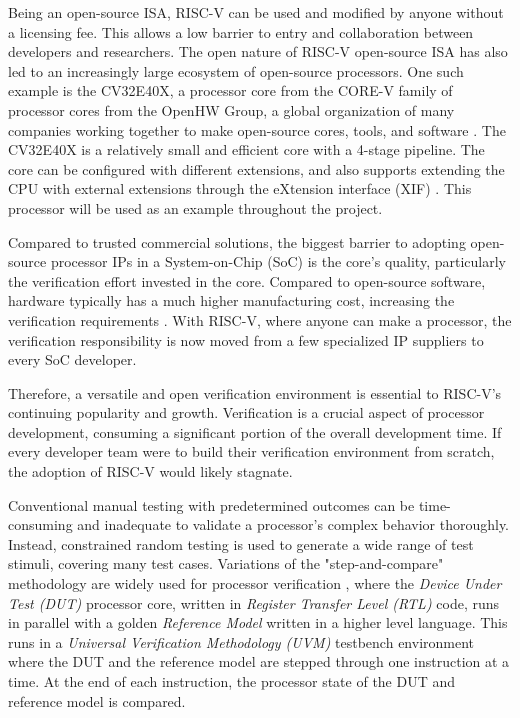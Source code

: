 Being an open-source ISA, RISC-V can be used and modified by anyone without a licensing fee. This allows a low barrier to entry and collaboration between developers and researchers. The open nature of RISC-V open-source ISA has also led to an increasingly large ecosystem of open-source processors. One such example is the CV32E40X, a processor core from the CORE-V family of processor cores from the OpenHW Group, a global organization of many companies working together to make open-source cores, tools, and software \cite{taylor_advanced_2023}. The CV32E40X is a relatively small and efficient core with a 4-stage pipeline. The core can be configured with different extensions, and also supports extending the CPU with external extensions through the eXtension interface (XIF) \cite{openhw_group_cv32e4_2022}. This processor will be used as an example throughout the project.




Compared to trusted commercial solutions, the biggest barrier to adopting open-source processor IPs in a System-on-Chip (SoC) is the core's quality, particularly the verification effort invested in the core. Compared to open-source software, hardware typically has a much higher manufacturing cost, increasing the verification requirements \cite{kevin_mcdermott_openhw_2022}.
With RISC-V, where anyone can make a processor, the verification responsibility is now moved from a few specialized IP suppliers to every SoC developer. 

Therefore, a versatile and open verification environment is essential to RISC-V's continuing popularity and growth. Verification is a crucial aspect of processor development, consuming a significant portion of the overall development time. If every developer team were to build their verification environment from scratch, the adoption of RISC-V would likely stagnate.

Conventional manual testing with predetermined outcomes can be time-consuming and inadequate to validate a processor's complex behavior thoroughly. Instead, constrained random testing is used to generate a wide range of test stimuli, covering many test cases. Variations of the "step-and-compare" methodology are widely used for processor verification \cite{taylor_advanced_2023}, where the \textit{Device Under Test (DUT)} processor core, written in \textit{Register Transfer Level (RTL)} code, runs in parallel with a golden \textit{Reference Model} written in a higher level language. This runs in a \textit{Universal Verification Methodology (UVM)} testbench environment where the DUT and the reference model are stepped through one instruction at a time. At the end of each instruction, the processor state of the DUT and reference model is compared.

